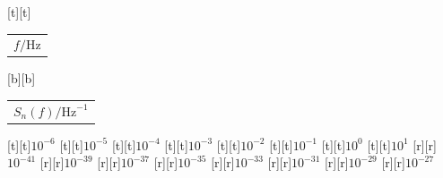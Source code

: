 %    
%
%
\begin{psfrags}%
\psfragscanon%
%
[t][t]{\color[rgb]{0,0,0}\setlength{\tabcolsep}{0pt}\begin{tabular}{c}{\Large$f/\mathrm{Hz}$}\end{tabular}}%
[b][b]{\color[rgb]{0,0,0}\setlength{\tabcolsep}{0pt}\begin{tabular}{c}{\Large$S_n(f)/\mathrm{Hz}^{-1}$\vspace{2mm}}\end{tabular}}%
%
[t][t]{$10^{-6}$}%
[t][t]{$10^{-5}$}%
[t][t]{$10^{-4}$}%
[t][t]{$10^{-3}$}%
[t][t]{$10^{-2}$}%
[t][t]{$10^{-1}$}%
[t][t]{$10^{0}$}%
[t][t]{$10^{1}$}%
%
[r][r]{$10^{-41}$}%
[r][r]{$10^{-39}$}%
[r][r]{$10^{-37}$}%
[r][r]{$10^{-35}$}%
[r][r]{$10^{-33}$}%
[r][r]{$10^{-31}$}%
[r][r]{$10^{-29}$}%
[r][r]{$10^{-27}$}%
%
%
\end{psfrags}%
%
